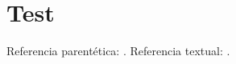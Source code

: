 \documentclass{ui1activity}
\begin{document}
\section{Test}
Referencia parentética: \parencite{ley1987}.
Referencia textual: \textcite{ley1987}.
\makebibliography
\end{document}
